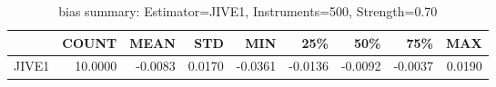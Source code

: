 \begin{table}[ht]
\centering
\caption{bias summary: Estimator=JIVE1, Instruments=500, Strength=0.70}
\begin{tabular}{lrrrrrrrr}
\toprule
 & COUNT & MEAN & STD & MIN & 25\% & 50\% & 75\% & MAX \\
\midrule
JIVE1 & 10.0000 & -0.0083 & 0.0170 & -0.0361 & -0.0136 & -0.0092 & -0.0037 & 0.0190 \\
\bottomrule
\end{tabular}
\end{table}
